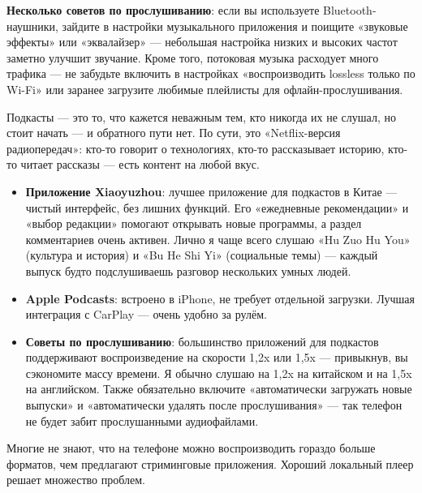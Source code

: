 \textbf{Несколько советов по прослушиванию}: если вы используете Bluetooth-наушники, зайдите в настройки музыкального приложения и поищите «звуковые эффекты» или «эквалайзер» — небольшая настройка низких и высоких частот заметно улучшит звучание. Кроме того, потоковая музыка расходует много трафика — не забудьте включить в настройках «воспроизводить lossless только по Wi-Fi» или заранее загрузите любимые плейлисты для офлайн-прослушивания.


Подкасты — это то, что кажется неважным тем, кто никогда их не слушал, но стоит начать — и обратного пути нет. По сути, это «Netflix-версия радиопередач»: кто-то говорит о технологиях, кто-то рассказывает историю, кто-то читает рассказы — есть контент на любой вкус.

\begin{itemize}
  \item \textbf{Приложение Xiaoyuzhou}: лучшее приложение для подкастов в Китае — чистый интерфейс, без лишних функций. Его «ежедневные рекомендации» и «выбор редакции» помогают открывать новые программы, а раздел комментариев очень активен. Лично я чаще всего слушаю «Hu Zuo Hu You» (культура и история) и «Bu He Shi Yi» (социальные темы) — каждый выпуск будто подслушиваешь разговор нескольких умных людей.
  \item \textbf{Apple Podcasts}: встроено в iPhone, не требует отдельной загрузки. Лучшая интеграция с CarPlay — очень удобно за рулём.
  \item \textbf{Советы по прослушиванию}: большинство приложений для подкастов поддерживают воспроизведение на скорости 1,2x или 1,5x — привыкнув, вы сэкономите массу времени. Я обычно слушаю на 1,2x на китайском и на 1,5x на английском. Также обязательно включите «автоматически загружать новые выпуски» и «автоматически удалять после прослушивания» — так телефон не будет забит прослушанными аудиофайлами.
\end{itemize}


Многие не знают, что на телефоне можно воспроизводить гораздо больше форматов, чем предлагают стриминговые приложения. Хороший локальный плеер решает множество проблем.

